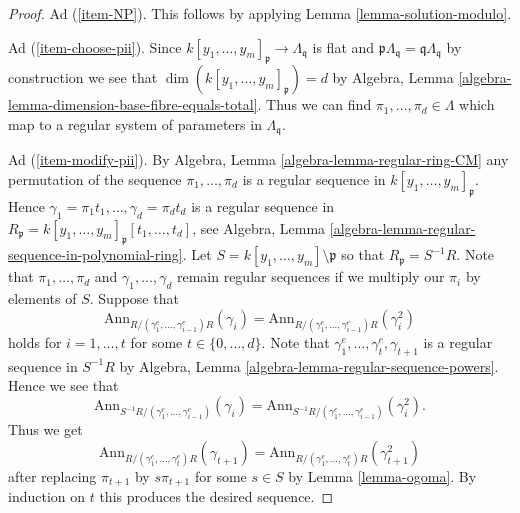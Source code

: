 \begin{proof}
\medskip\noindent
Ad (\ref{item-NP}). This follows by applying Lemma \ref{lemma-solution-modulo}.

\medskip\noindent
Ad (\ref{item-choose-pii}). Since
$k[y_1, \ldots, y_m]_\mathfrak p \to \Lambda_\mathfrak q$ is
flat and $\mathfrak p \Lambda_\mathfrak q = \mathfrak q \Lambda_\mathfrak q$
by construction
we see that $\dim(k[y_1, \ldots, y_m]_\mathfrak p) = d$ by
Algebra, Lemma \ref{algebra-lemma-dimension-base-fibre-equals-total}.
Thus we can find $\pi_1, \ldots, \pi_d \in \Lambda$ which map to
a regular system of parameters in $\Lambda_\mathfrak q$.

\medskip\noindent
Ad (\ref{item-modify-pii}). By
Algebra, Lemma \ref{algebra-lemma-regular-ring-CM}
any permutation of the sequence $\pi_1, \ldots, \pi_d$ is a
regular sequence in $k[y_1, \ldots, y_m]_\mathfrak p$. Hence
$\gamma_1 = \pi_1 t_1, \ldots, \gamma_d = \pi_d t_d$ is a regular
sequence in
$R_\mathfrak p = k[y_1, \ldots, y_m]_\mathfrak p[t_1, \ldots, t_d]$, see
Algebra, Lemma \ref{algebra-lemma-regular-sequence-in-polynomial-ring}.
Let $S = k[y_1, \ldots, y_m] \setminus \mathfrak p$ so that
$R_\mathfrak p = S^{-1}R$. Note that $\pi_1, \ldots, \pi_d$
and $\gamma_1, \ldots, \gamma_d$
remain regular sequences if we multiply our $\pi_i$ by elements of $S$.
Suppose that
$$
\text{Ann}_{R/(\gamma_1^e, \ldots, \gamma_{i - 1}^e)R}(\gamma_i)
=
\text{Ann}_{R/(\gamma_1^e, \ldots, \gamma_{i - 1}^e)R}(\gamma_i^2)
$$
holds for $i = 1, \ldots, t$ for some $t \in \{0, \ldots, d\}$. Note that
$\gamma_1^e, \ldots, \gamma_t^e, \gamma_{t + 1}$ is a
regular sequence in $S^{-1}R$ by
Algebra, Lemma \ref{algebra-lemma-regular-sequence-powers}.
Hence we see that
$$
\text{Ann}_{S^{-1}R/(\gamma_1^e, \ldots, \gamma_{i - 1}^e)}(\gamma_i) =
\text{Ann}_{S^{-1}R/(\gamma_1^e, \ldots, \gamma_{i - 1}^e)}(\gamma_i^2).
$$
Thus we get
$$
\text{Ann}_{R/(\gamma_1^e, \ldots, \gamma_t^e)R}(\gamma_{t + 1})
=
\text{Ann}_{R/(\gamma_1^e, \ldots, \gamma_t^e)R}(\gamma_{t + 1}^2)
$$
after replacing $\pi_{t + 1}$ by $s\pi_{t + 1}$ for some $s \in S$ by
Lemma \ref{lemma-ogoma}. By induction on $t$ this produces the desired
sequence.


\end{proof}
